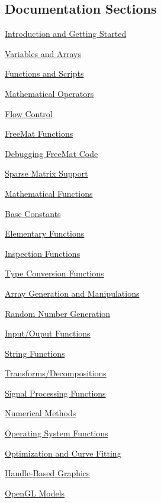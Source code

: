 \subsection*{Documentation Sections }


\begin{DoxyItemize}
\item \hyperlink{sec_introduction}{Introduction and Getting Started}  
\item \hyperlink{sec_variables}{Variables and Arrays}  
\item \hyperlink{sec_functions}{Functions and Scripts}  
\item \hyperlink{sec_operators}{Mathematical Operators}  
\item \hyperlink{sec_flow}{Flow Control}  
\item \hyperlink{sec_freemat}{Free\-Mat Functions}  
\item \hyperlink{sec_debug}{Debugging Free\-Mat Code}  
\item \hyperlink{sec_sparse}{Sparse Matrix Support}  
\item \hyperlink{sec_mathfunctions}{Mathematical Functions}  
\item \hyperlink{sec_constants}{Base Constants}  
\item \hyperlink{sec_elementary}{Elementary Functions}  
\item \hyperlink{sec_inspection}{Inspection Functions}  
\item \hyperlink{sec_typecast}{Type Conversion Functions}  
\item \hyperlink{sec_array}{Array Generation and Manipulations}  
\item \hyperlink{sec_random}{Random Number Generation}  
\item \hyperlink{sec_io}{Input/\-Ouput Functions}  
\item \hyperlink{sec_string}{String Functions}  
\item \hyperlink{sec_transforms}{Transforms/\-Decompositions}  
\item \hyperlink{sec_signal}{Signal Processing Functions}  
\item \hyperlink{sec_num}{Numerical Methods}  
\item \hyperlink{sec_os}{Operating System Functions}  
\item \hyperlink{sec_curvefit}{Optimization and Curve Fitting}  
\item \hyperlink{sec_handle}{Handle-\/\-Based Graphics}  
\item \hyperlink{sec_glwin}{Open\-G\-L Models}  

\end{DoxyItemize}
